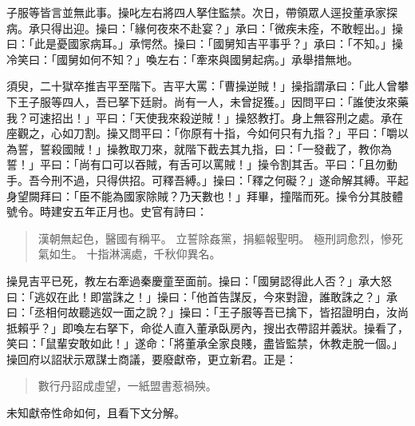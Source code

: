 子服等皆言並無此事。操叱左右將四人拏住監禁。次日，帶領眾人逕投董承家探病。承只得出迎。操曰：「緣何夜來不赴宴？」承曰：「微疾未痊，不敢輕出。」操曰：「此是憂國家病耳。」承愕然。操曰：「國舅知吉平事乎？」承曰：「不知。」操冷笑曰：「國舅如何不知？」喚左右：「牽來與國舅起病。」承舉措無地。

須臾，二十獄卒推吉平至階下。吉平大罵：「曹操逆賊！」操指謂承曰：「此人曾攀下王子服等四人，吾已拏下廷尉。尚有一人，未曾捉獲。」因問平曰：「誰使汝來藥我？可速招出！」平曰：「天使我來殺逆賊！」操怒教打。身上無容刑之處。承在座觀之，心如刀割。操又問平曰：「你原有十指，今如何只有九指？」平曰：「嚼以為誓，誓殺國賊！」操教取刀來，就階下截去其九指，曰：「一發截了，教你為誓！」平曰：「尚有口可以吞賊，有舌可以罵賊！」操令割其舌。平曰：「且勿動手。吾今刑不過，只得供招。可釋吾縛。」操曰：「釋之何礙？」遂命解其縛。平起身望闕拜曰：「臣不能為國家除賊？乃天數也！」拜畢，撞階而死。操令分其肢體號令。時建安五年正月也。史官有詩曰：

\begin{quote}
漢朝無起色，醫國有稱平。
立誓除姦黨，捐軀報聖明。
極刑詞愈烈，慘死氣如生。
十指淋漓處，千秋仰異名。
\end{quote}

操見吉平已死，教左右牽過秦慶童至面前。操曰：「國舅認得此人否？」承大怒曰：「逃奴在此！即當誅之！」操曰：「他首告謀反，今來對證，誰敢誅之？」承曰：「丞相何故聽逃奴一面之說？」操曰：「王子服等吾已擒下，皆招證明白，汝尚抵賴乎？」即喚左右拏下，命從人直入董承臥房內，搜出衣帶詔并義狀。操看了，笑曰：「鼠輩安敢如此！」遂命：「將董承全家良賤，盡皆監禁，休教走脫一個。」操回府以詔狀示眾謀士商議，要廢獻帝，更立新君。正是：

\begin{quote}
數行丹詔成虛望，一紙盟書惹禍殃。
\end{quote}

未知獻帝性命如何，且看下文分解。
